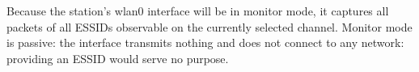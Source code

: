 Because the station's wlan0 interface will be in monitor mode, it captures all packets of all ESSIDs observable on the currently selected channel. Monitor mode is passive: the interface transmits nothing and does not connect to any network: providing an ESSID would serve no purpose.
